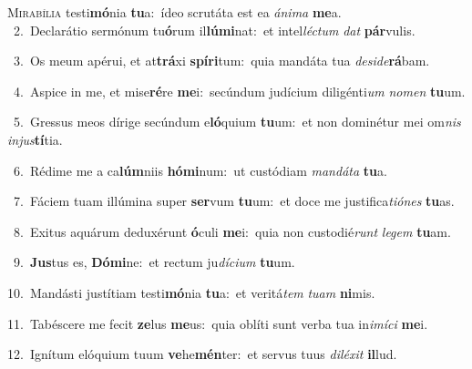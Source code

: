 \lettrine{\initial\textcolor{\initialcolor}{M}}{irabília} testi\-\textbf{mó}\-nia \textbf{tu}\-a:~\star ídeo scrutáta est ea \textit{á}\-\textit{ni}\textit{ma} \textbf{me}\-a.\\
{\numbfont\textcolor{\numbcolor}{~2.}}~Declarátio sermónum tu\-\textbf{ó}\-rum il\-\textbf{lú}\-\textbf{mi}nat:~\star et intel\-\textit{léc}\-\textit{tum} \textit{dat} \textbf{pár}\-vulis.\par
{\numbfont\textcolor{\numbcolor}{~3.}}~Os meum apérui, et at\-\textbf{trá}\-xi \textbf{spí}\-\textbf{ri}tum:~\star quia mandáta tua \textit{de}\-\textit{si}\textit{de}\textbf{rá}bam.\par
{\numbfont\textcolor{\numbcolor}{~4.}}~Aspice in me, et mise\-\textbf{ré}\-re \textbf{me}\-i:~\star secúndum judícium diligénti\textit{um} \textit{no}\-\textit{men} \textbf{tu}\-um.\par
{\numbfont\textcolor{\numbcolor}{~5.}}~Gressus meos dírige secúndum e\-\textbf{ló}\-quium \textbf{tu}\-um:~\star et non dominétur mei om\textit{nis} \textit{in}\-\textit{jus}\textbf{tí}tia.\par
{\numbfont\textcolor{\numbcolor}{~6.}}~Rédime me a ca\-\textbf{lúm}\-niis \textbf{hó}\-\textbf{mi}num:~\star ut custódiam \textit{man}\-\textit{dá}\textit{ta} \textbf{tu}\-a.\par
{\numbfont\textcolor{\numbcolor}{~7.}}~Fáciem tuam illúmina super \textbf{ser}\-vum \textbf{tu}\-um:~\star et doce me justifica\-\textit{ti}\-\textit{ó}\textit{nes} \textbf{tu}\-as.\par
{\numbfont\textcolor{\numbcolor}{~8.}}~Exitus aquárum deduxérunt \textbf{ó}\-culi \textbf{me}\-i:~\star quia non custodié\textit{runt} \textit{le}\-\textit{gem} \textbf{tu}\-am.\par
{\numbfont\textcolor{\numbcolor}{~9.}}~\-\textbf{Jus}\-tus es, \textbf{Dó}\-\textbf{mi}ne:~\star et rectum ju\-\textit{dí}\-\textit{ci}\textit{um} \textbf{tu}\-um.\par
{\numbfont\textcolor{\numbcolor}{10.}}~Mandásti justítiam testi\-\textbf{mó}\-nia \textbf{tu}\-a:~\star et veritá\textit{tem} \textit{tu}\-\textit{am} \textbf{ni}\-mis.\par
{\numbfont\textcolor{\numbcolor}{11.}}~Tabéscere me fecit \textbf{ze}\-lus \textbf{me}\-us:~\star quia oblíti sunt verba tua in\-\textit{i}\-\textit{mí}\textit{ci} \textbf{me}\-i.\par
{\numbfont\textcolor{\numbcolor}{12.}}~Ignítum elóquium tuum \textbf{ve}\-he\-\textbf{mén}\-ter:~\star et servus tuus \textit{di}\-\textit{lé}\textit{xit} \textbf{il}\-lud.\par
